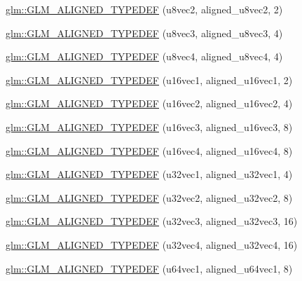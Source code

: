 \begin{DoxyCompactItemize}
\item 
\hyperlink{group__gtx__type__aligned_ga19837e6f72b60d994a805ef564c6c326}{glm\-::\-G\-L\-M\-\_\-\-A\-L\-I\-G\-N\-E\-D\-\_\-\-T\-Y\-P\-E\-D\-E\-F} (u8vec2, aligned\-\_\-u8vec2, 2)
\item 
\hyperlink{group__gtx__type__aligned_ga9740cf8e34f068049b42a2753f9601c2}{glm\-::\-G\-L\-M\-\_\-\-A\-L\-I\-G\-N\-E\-D\-\_\-\-T\-Y\-P\-E\-D\-E\-F} (u8vec3, aligned\-\_\-u8vec3, 4)
\item 
\hyperlink{group__gtx__type__aligned_ga8b8588bb221448f5541a858903822a57}{glm\-::\-G\-L\-M\-\_\-\-A\-L\-I\-G\-N\-E\-D\-\_\-\-T\-Y\-P\-E\-D\-E\-F} (u8vec4, aligned\-\_\-u8vec4, 4)
\item 
\hyperlink{group__gtx__type__aligned_ga991abe990c16de26b2129d6bc2f4c051}{glm\-::\-G\-L\-M\-\_\-\-A\-L\-I\-G\-N\-E\-D\-\_\-\-T\-Y\-P\-E\-D\-E\-F} (u16vec1, aligned\-\_\-u16vec1, 2)
\item 
\hyperlink{group__gtx__type__aligned_gac01bb9fc32a1cd76c2b80d030f71df4c}{glm\-::\-G\-L\-M\-\_\-\-A\-L\-I\-G\-N\-E\-D\-\_\-\-T\-Y\-P\-E\-D\-E\-F} (u16vec2, aligned\-\_\-u16vec2, 4)
\item 
\hyperlink{group__gtx__type__aligned_ga09540dbca093793a36a8997e0d4bee77}{glm\-::\-G\-L\-M\-\_\-\-A\-L\-I\-G\-N\-E\-D\-\_\-\-T\-Y\-P\-E\-D\-E\-F} (u16vec3, aligned\-\_\-u16vec3, 8)
\item 
\hyperlink{group__gtx__type__aligned_gaecafb5996f5a44f57e34d29c8670741e}{glm\-::\-G\-L\-M\-\_\-\-A\-L\-I\-G\-N\-E\-D\-\_\-\-T\-Y\-P\-E\-D\-E\-F} (u16vec4, aligned\-\_\-u16vec4, 8)
\item 
\hyperlink{group__gtx__type__aligned_gac6b161a04d2f8408fe1c9d857e8daac0}{glm\-::\-G\-L\-M\-\_\-\-A\-L\-I\-G\-N\-E\-D\-\_\-\-T\-Y\-P\-E\-D\-E\-F} (u32vec1, aligned\-\_\-u32vec1, 4)
\item 
\hyperlink{group__gtx__type__aligned_ga1fa0dfc8feb0fa17dab2acd43e05342b}{glm\-::\-G\-L\-M\-\_\-\-A\-L\-I\-G\-N\-E\-D\-\_\-\-T\-Y\-P\-E\-D\-E\-F} (u32vec2, aligned\-\_\-u32vec2, 8)
\item 
\hyperlink{group__gtx__type__aligned_ga0019500abbfa9c66eff61ca75eaaed94}{glm\-::\-G\-L\-M\-\_\-\-A\-L\-I\-G\-N\-E\-D\-\_\-\-T\-Y\-P\-E\-D\-E\-F} (u32vec3, aligned\-\_\-u32vec3, 16)
\item 
\hyperlink{group__gtx__type__aligned_ga14fd29d01dae7b08a04e9facbcc18824}{glm\-::\-G\-L\-M\-\_\-\-A\-L\-I\-G\-N\-E\-D\-\_\-\-T\-Y\-P\-E\-D\-E\-F} (u32vec4, aligned\-\_\-u32vec4, 16)
\item 
\hyperlink{group__gtx__type__aligned_gab253845f534a67136f9619843cade903}{glm\-::\-G\-L\-M\-\_\-\-A\-L\-I\-G\-N\-E\-D\-\_\-\-T\-Y\-P\-E\-D\-E\-F} (u64vec1, aligned\-\_\-u64vec1, 8)

\end{DoxyCompactItemize}
